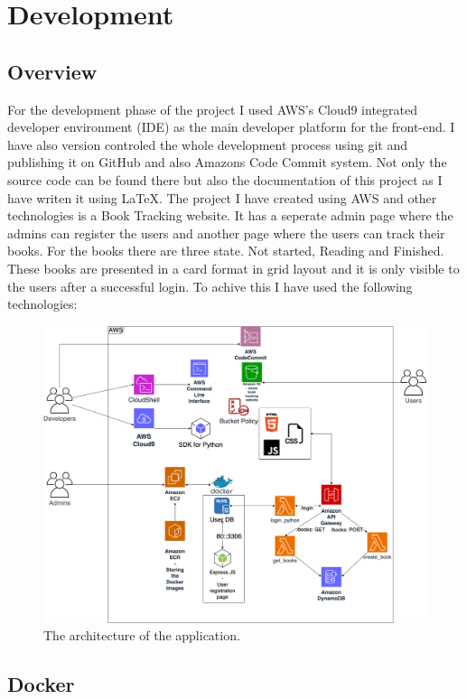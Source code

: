 \documentclass[11pt,a4paper,oneside]{report}
\begin{document}
\chapter{Development}

\section{Overview}
For the development phase of the project I used AWS's Cloud9 integrated developer environment (IDE) as the main developer platform for the front-end.
I have also version controled the whole development process using git and publishing it on GitHub and also Amazons Code Commit system. Not only the source code can be found there but also the documentation of this project as I have writen it using \LaTeX{}.
The project I have created using AWS and other technologies is a Book Tracking website. It has a seperate admin page where the admins can register the users and another page where the users can track their books.
For the books there are three state. Not started, Reading and Finished. These books are presented in a card format in grid layout and it is only visible to the users after a successful login.
To achive this I have used the following technologies:

\begin{figure}[!ht]
  \centering
  \includegraphics[scale=0.23]{aws.drawio.png}
  \caption{The architecture of the application.}
  \label{fig:TexnicCenter}
\end{figure}

\section{Docker}
\end{document}
